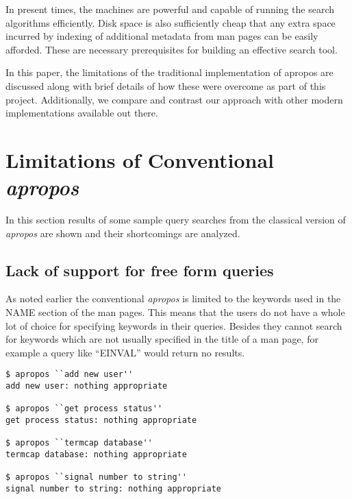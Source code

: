 \documentclass[titlepage, a4paper, 12pt]{article}
\begin{document}
In present times, the machines are powerful and  capable of running the search
algorithms efficiently. Disk
space is also sufficiently cheap that any extra space incurred by indexing of
additional metadata from man pages
can be easily afforded. These are necessary prerequisites for building an
effective search tool.

In this paper, the limitations of the traditional implementation of apropos
are discussed along with brief details of how these were overcome as part of
this project. Additionally, we compare and contrast our approach with other
modern implementations available out there.


\section{Limitations of Conventional \textit{apropos}}
In this section results of some sample query searches from
the classical version of \textit{apropos} are shown and their shortcomings are
analyzed.

\subsection{Lack of support for free form queries}
As noted earlier the conventional \textit{apropos} is limited to the keywords
used in the NAME section of the man pages. This means that the users do not have
a whole lot of choice for specifying keywords in their queries. Besides they
cannot search for keywords which are not usually specified in the title of a man
page, for example a query like ``EINVAL'' would return no results.
\begin{lstlisting}
$ apropos ``add new user''
add new user: nothing appropriate

$ apropos ``get process status''
get process status: nothing appropriate

$ apropos ``termcap database''
termcap database: nothing appropriate

$ apropos ``signal number to string''
signal number to string: nothing appropriate
\end{lstlisting}
\end{document}
